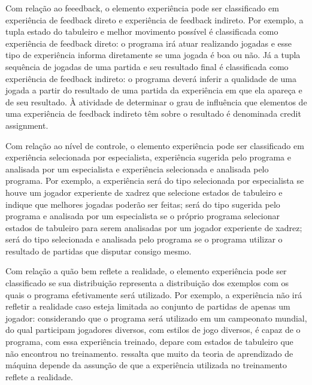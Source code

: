 Com relação ao feeedback, o elemento experiência pode ser classificado em experiência de feedback direto e experiência de feedback indireto. Por exemplo, a tupla estado do tabuleiro e melhor movimento possível é classificada como experiência de feedback direto: o programa irá atuar realizando jogadas e esse tipo de experiência informa diretamente se uma jogada é boa ou não. Já a tupla sequência de jogadas de uma partida e seu resultado final é classificada como experiência de feedback indireto: o programa deverá inferir a qualidade de uma jogada a partir do resultado de uma partida da experiência em que ela apareça e de seu resultado. À atividade de determinar o grau de influência que elementos de uma experiência de feedback indireto têm sobre o resultado é denominada credit assignment.

Com relação ao nível de controle, o elemento experiência pode ser classificado em experiência selecionada por especialista, experiência sugerida pelo programa e analisada por um especialista e experiência selecionada e analisada pelo programa. Por exemplo, a experiência será do tipo selecionada por especialista se houve um jogador experiente de xadrez que selecione estados de tabuleiro e indique que melhores jogadas poderão ser feitas; será do tipo sugerida pelo programa e analisada por um especialista se o próprio programa selecionar estados de tabuleiro para serem analisadas por um jogador experiente de xadrez; será do tipo selecionada e analisada pelo programa se o programa utilizar o resultado de partidas que disputar consigo mesmo.

Com relação a quão bem reflete a realidade, o elemento experiência pode ser classificado se sua distribuição representa a distribuição dos exemplos com os quais o programa efetivamente será utilizado. Por exemplo, a experiência não irá refletir a realidade caso esteja limitada ao conjunto de partidas de apenas um jogador: considerando que o programa será utilizado em um campeonato mundial, do qual participam jogadores diversos, com estilos de jogo diversos, é capaz de o programa, com essa experiência treinado, depare com estados de tabuleiro que não encontrou no treinamento. \cite{Tom_mitchell} ressalta que muito da teoria de aprendizado de máquina depende da assunção de que a experiência utilizada no treinamento reflete a realidade.


